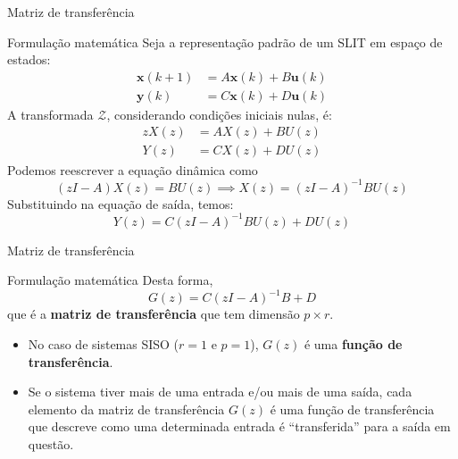 \begin{frame}{Matriz de transferência}
\begin{block}{Formulação matemática}
Seja a representação padrão de um SLIT em espaço de estados:
\begin{align*}
    \bm{x}(k+1) &= A\bm{x}(k) + B\bm{u}(k) \\
    \bm{y}(k) &= C\bm{x}(k) + D\bm{u}(k)
\end{align*}
A transformada $\mathcal{Z}$, considerando condições iniciais nulas, é:
\begin{align*}
    zX(z) &= AX(z) + BU(z) \\
    Y(z)  &= CX(z) + DU(z)
\end{align*}
Podemos reescrever a equação dinâmica como
$$(zI - A)X(z) = BU(z) \implies X(z) = (zI - A)^{-1}BU(z)$$
Substituindo na equação de saída, temos:
$$Y(z) = C(zI - A)^{-1} BU(z) + DU(z)$$
\end{block}
\end{frame}

\begin{frame}{Matriz de transferência}
\begin{block}{Formulação matemática}
Desta forma,
$$\boxed{G(z) = C(zI - A)^{-1} B + D}$$
que é a \textbf{matriz de transferência} que tem dimensão $p \times r$.
\begin{itemize}
    \item No caso de sistemas SISO ($r=1$ e $p=1$), $G(z)$ é uma \textbf{função de transferência}. 
    \item Se o sistema tiver mais de uma entrada e/ou mais de uma saída, cada elemento da matriz de transferência $G(z)$ é uma função de transferência que descreve como uma determinada entrada é ``transferida” para a saída em questão. 
\end{itemize}
\end{block}
\end{frame}


